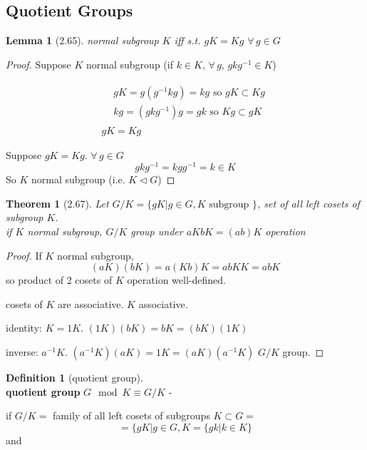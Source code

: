 \documentclass[twoside,landscape]{amsart}
\theoremstyle{plain}
\newtheorem{theorem}{Theorem}
\newtheorem{lemma}{Lemma}
\theoremstyle{definition}
\newtheorem{definition}{Definition}
\theoremstyle{remark}
\begin{document}
\begin{multicols*}{2}
\subsection{Quotient Groups }

\begin{lemma}[2.65] normal subgroup $K$ iff s.t. $gK = Kg$ \quad $\forall \, g \in G$ \end{lemma} 

\begin{proof} Suppose $K$ normal subgroup (if $k\in K, \, \forall \, g$, $gk g^{-1} \in K$)

\[
\begin{gathered}
  \begin{aligned}
    & gK = g(g^{-1} k g) = kg \text{ so } gK \subset Kg \\ 
    & kg = (gkg^{-1})g = gk \text{ so } Kg \subset gK 
\end{aligned} \\
gK = Kg 
\end{gathered}
\]


Suppose $gK = Kg$.  $\forall \, g \in G$ 
\[
gkg^{-1} = kgg^{-1} = k \in K 
\]
So $K$ normal subgroup (i.e. $K \lhd G$)


\end{proof}

\begin{theorem}[2.67] Let $G/K = \lbrace gK  | g\in G, K \text{ subgroup }\rbrace$, set of all left cosets of subgroup $K$.   \\
if $K$ normal subgroup, $G/K$ group under $aK bK = (ab) K$ operation \end{theorem}

\begin{proof}
If $K$ normal subgroup, 
\[
(aK) (bK) = a(Kb)K = abKK = abK
\]
so product of 2 cosets of $K$ operation well-defined.  

cosets of $K$ are associative.  $K$ associative.  

identity: $K=1K$.  $(1K)(bK) = bK = (bK)(1K)$

inverse: $a^{-1} K$.  $(a^{-1}K)(aK) = 1 K = (aK)(a^{-1}K)$ $G/K$ group.  

\end{proof}

\begin{definition}[quotient group] \qquad \, \\
\textbf{quotient group} $G\mod{K} \equiv G/K$ -  

if $G/K = $ family of all left cosets of subgroups $K\subset G = $
\[ 
= \lbrace gK | g\in G, K = \lbrace gk | k \in K \rbrace 
\]
and 


\end{definition}
\end{multicols*}
\end{document}
